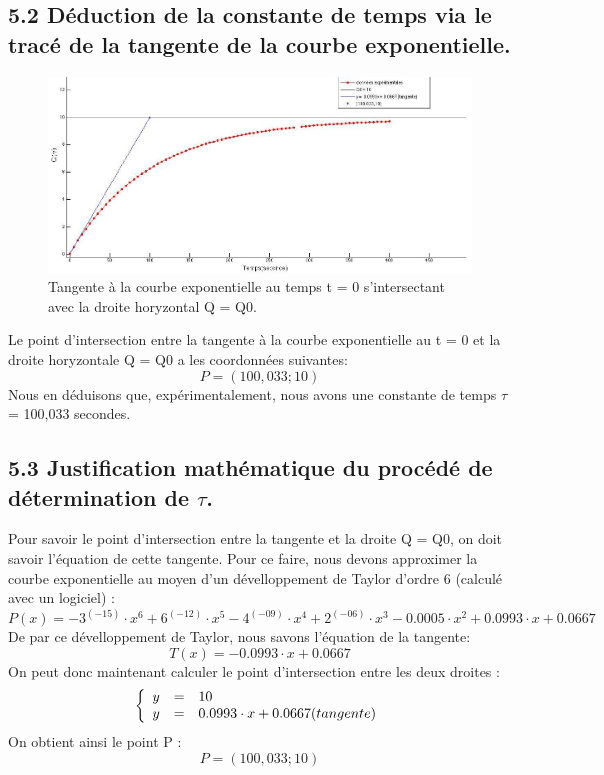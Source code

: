 \documentclass{report}
\begin{document}
\subsection*{5.2 D\'eduction de la constante de temps via le trac\'e de la tangente de la courbe exponentielle.}
\hspace*{0.5cm}

\begin{figure}[ht!]
\centering
\includegraphics[width=140mm]{3-1graph243.jpg}
\caption{Tangente \`a la courbe exponentielle au temps t = 0 s'intersectant avec la droite horyzontal Q = Q0.}
\label{overflow}
\end{figure}
\pagebreak
Le point d'intersection entre la tangente \`a la courbe exponentielle au t = 0 et la droite horyzontale Q = Q0 a les coordonn\'ees suivantes:
\begin{equation}
   P = (100,033;10)
\end{equation}
Nous en d\'eduisons que, exp\'erimentalement, nous avons une constante de temps $\tau$ = 100,033 secondes.
\subsection*{5.3 Justification math\'ematique du proc\'ed\'e de d\'etermination de $\tau$.}
\hspace*{0.5cm}
Pour savoir le point d'intersection entre la tangente et la droite Q = Q0, on doit savoir l'\'equation de cette tangente.
Pour ce faire, nous devons approximer la courbe exponentielle au moyen d'un d\'evelloppement de Taylor d'ordre 6 (calcul\'e avec un logiciel) :
\begin{equation}
   P(x) = -3^{(-15)} \cdot x^6 + 6^{(-12)} \cdot x^5 - 4^{(-09)}\cdot x^4 + 2^{(-06)}\cdot x^3 - 0.0005\cdot x^2 + 0.0993\cdot x + 0.0667
\end{equation}
De par ce d\'evelloppement de Taylor, nous savons l'\'equation de la tangente:
\begin{equation}
   T(x) = -0.0993\cdot x + 0.0667
\end{equation}
On peut donc maintenant calculer le point d'intersection entre les deux droites :
\[
\left\{
\begin{array}{r c l}
y &=& 10\\
y &=& 0.0993\cdot x + 0.0667 (tangente)\\
\end{array}
\right.
\]
On obtient ainsi le point P :
\begin{equation}
   P = (100,033;10)
\end{equation}
\end{document}
